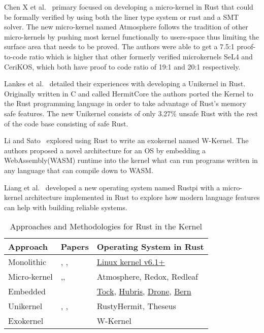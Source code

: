 \documentclass[sigconf]{acmart}
\begin{document}
Chen X et al.~\cite{Chen2023-wb} primary focused on developing a micro-kernel in Rust that could be formally verified by using both the liner type system or rust and a SMT solver. The new micro-kernel named Atmosphere follows the tradition of other micro-kernels by pushing most kernel functionally to users-space thus limiting the surface area that needs to be proved. The authors were able to get a 7.5:1 proof-to-code ratio which is higher that other formerly verified microkernels SeL4 and CeriKOS, which both have proof to code ratio of 19:1 and 20:1 respectively.

Lankes et al.~\cite{Lankes2019-cm} detailed their experiences with developing a Unikernel in Rust. Originally written in C and called HermitCore the authors ported the Kernel to the Rust programming language in order to take advantage of Rust's memory safe features. The new Unikernel consists of only 3.27\% unsafe Rust with the rest of the code base consisting of safe Rust.

Li and Sato~\cite{Li2024-yb} explored using Rust to write an exokernel named W-Kernel. The authors proposed a novel architecture for an OS by embedding a WebAssembly(WASM) runtime into the kernel what can run programs written in any language that can compile down to WASM.

Liang et al.~\cite{Liang2021-bo} developed a new operating system named Rustpi with a micro-kernel architecture implemented in Rust to explore how modern language features can help with building reliable systems.

\begin{table}
    \begin{tabular}{||l|l|l||}
    \hline
    Approach & Papers & Operating System in Rust\\
    \hline\hline
    Monolithic  & \cite{The_kernel_development_community_undated-iw}, \cite{Li2019-ru}, \cite{Miller2021-pg} & \href{https://docs.kernel.org/rust/}{Linux kernel v6.1+}\\
    Micro-kernel & \cite{Chen2023-wb},\cite{Liang2021-bo}, \cite{Liu2024-xe} \cite{} & Atmosphere, Redox, Redleaf\\
    Embedded & \cite{Culic2022-bk} & \href{https://github.com/tock/tock}{Tock}, \href{https://hubris.oxide.computer/}{Hubris}, \href{https://www.drone-os.com/}{Drone}, \href{https://bern-rtos.org/}{Bern} \\
    Unikernel & \cite{Lankes2019-cm},  \cite{Boos2020-zh}, \cite{Ijaz2023-da}  & RustyHermit, Theseus \\
    Exokernel & \cite{Li2024-yb} & W-Kernel \\
    \hline
  \end{tabular}
  \caption{Approaches and Methodologies for Rust in the Kernel}
    \label{tab:RQ1}
\end{table}
\end{document}
